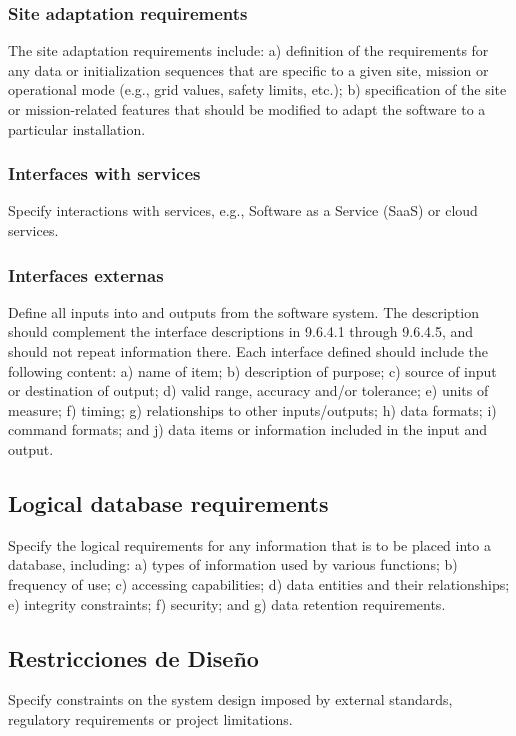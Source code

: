 \documentclass[12pt, a4paper, twoside]{article}
\begin{document}
 \subsubsection{Site adaptation requirements}
 The site adaptation requirements include:
 a) definition of the requirements for any data or initialization sequences that are specific to a given
 site, mission or operational mode (e.g., grid values, safety limits, etc.);
 b) specification of the site or mission-related features that should be modified to adapt the software
 to a particular installation.

 \subsubsection{Interfaces with services}
 Specify interactions with services, e.g., Software as a Service (SaaS) or cloud services.

 \subsubsection{Interfaces externas}
 Define all inputs into and outputs from the software system. The description should complement the
 interface descriptions in 9.6.4.1 through 9.6.4.5, and should not repeat information there.
 Each interface defined should include the following content:
 a) name of item;
 b) description of purpose;
 c) source of input or destination of output;
 d) valid range, accuracy and/or tolerance;
 e) units of measure;
 f) timing;
 g) relationships to other inputs/outputs;
 h) data formats;
 i) command formats; and
 j) data items or information included in the input and output.

 \subsection{Logical database requirements}
 Specify the logical requirements for any information that is to be placed into a database, including:
 a) types of information used by various functions;
 b) frequency of use;
 c) accessing capabilities;
 d) data entities and their relationships;
 e) integrity constraints;
 f) security; and
 g) data retention requirements.

 \subsection{Restricciones de Diseño}
 Specify constraints on the system design imposed by external standards, regulatory requirements or
 project limitations.
\end{document}
